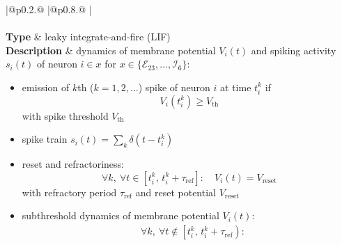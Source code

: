 \documentclass[10pt,a4paper,twoside,american]{article}
\theoremstyle{definitionstyle}
\newcommand{\tauR}{\tau_\text{ref}}
\begin{document}
\begin{table}[H]
\renewcommand{\arraystretch}{1.2}
\begin{tabular}{
  |@{\hspace*{\marg}}p{}@{\hspace*{\marg}}
  |@{\hspace*{\marg}}p{}@{\hspace*{\marg}}
  |}
  \hline 
  \\
  \hline
  \\
  \hline
  \textbf{Type} & leaky integrate-and-fire (LIF)\\
  \hline 
  \textbf{Description} & dynamics of membrane potential $V_{i}(t)$ and spiking activity $s_i(t)$ of neuron $i\in x$ for $x\in\{\mathcal{E}_{23},\ldots,\mathcal{I}_{6}\}$:
                         \begin{itemize}
                         \item emission of $k$th ($k=1,2,\ldots$) spike of neuron $i$ at time $t_{i}^{k}$ if
                           \begin{equation}
                             V_{i}\left(t_{i}^{k}\right)\geq{}V_\text{th}  
                           \end{equation}
                           with spike threshold $V_\text{th}$
                         \item spike train $\displaystyle s_i(t)=\sum_k \delta(t-t_i^k)$                           
                         \item reset and refractoriness:
                           \begin{equation}
				   \forall{}k,\ \forall t \in \left[t_{i}^{k},\,t_{i}^{k}+\tauR\right]:\quad V_{i}(t)=V_\text{reset}  
                           \end{equation}
                            with refractory period $\tauR$ and reset potential $V_\text{reset}$
                         \item subthreshold dynamics of membrane potential $V_{i}(t)$:
                           \begin{equation}
			     \label{eq:membrane_potential}
                             \begin{aligned}
                               &\forall{}k,\ \forall t \notin \left[t_{i}^{k},\,t_{i}^{k}+\tauR\right):\\

\end{aligned}
\end{equation}
\end{itemize}
\end{tabular}
\end{table}
\end{document}
